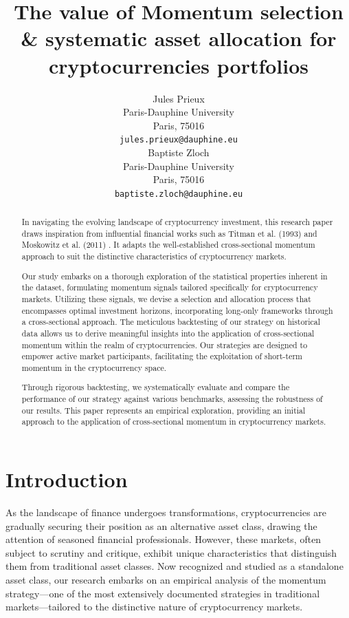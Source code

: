 \documentclass{article}
\title{The value of Momentum selection \&  systematic asset allocation for cryptocurrencies portfolios}
\author{
 Jules Prieux \\
  Paris-Dauphine University\\
  Paris, 75016  \\
  \texttt{jules.prieux@dauphine.eu} \\
   \And
 Baptiste Zloch \\
  Paris-Dauphine University\\
  Paris, 75016 \\
  \texttt{baptiste.zloch@dauphine.eu} \\
}
\begin{document}
\maketitle
\begin{abstract}

In navigating the evolving landscape of cryptocurrency investment, this research paper draws inspiration from influential financial works such as Titman et al. (1993)\cite{Titman1993} and  Moskowitz et al. 
 (2011) \cite{Moskowitz2011}. It adapts the well-established cross-sectional momentum approach to suit the distinctive characteristics of cryptocurrency markets.

Our study embarks on a thorough exploration of the statistical properties inherent in the dataset, formulating momentum signals tailored specifically for cryptocurrency markets. Utilizing these signals, we devise a selection and allocation process that encompasses optimal investment horizons, incorporating long-only frameworks through a cross-sectional approach. The meticulous backtesting of our strategy on historical data allows us to derive meaningful insights into the application of cross-sectional momentum within the realm of cryptocurrencies. Our strategies are designed to empower active market participants, facilitating the exploitation of short-term momentum in the cryptocurrency space.

Through rigorous backtesting, we systematically evaluate and compare the performance of our strategy against various benchmarks, assessing the robustness of our results. This paper represents an empirical exploration, providing an initial approach to the application of cross-sectional momentum in cryptocurrency markets.
\end{abstract}
\vspace*{\fill}
\newpage
\section{Introduction}\label{sec:introduction}

As the landscape of finance undergoes transformations, cryptocurrencies are gradually securing their position as an alternative asset class, drawing the attention of seasoned financial professionals. However, these markets, often subject to scrutiny and critique, exhibit unique characteristics that distinguish them from traditional asset classes. Now recognized and studied as a standalone asset class, our research embarks on an empirical analysis of the momentum strategy—one of the most extensively documented strategies in traditional markets—tailored to the distinctive nature of cryptocurrency markets.
\end{document}
